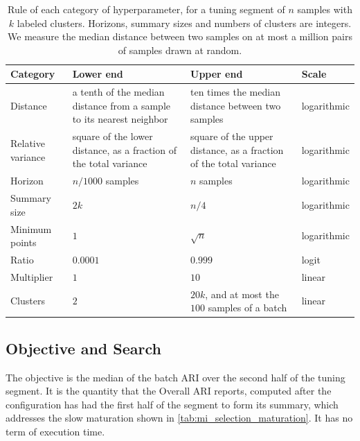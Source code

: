 \begin{table}[htbp]
\centering
\caption[Rule of each category of hyperparameter]{Rule of each category of hyperparameter, for a tuning segment of $n$ samples with $k$ labeled clusters. Horizons, summary sizes and numbers of clusters are integers. We measure the median distance between two samples on at most a million pairs of samples drawn at random.}
\begin{tabular}{p{} p{} p{} l}
\toprule
Category & Lower end & Upper end & Scale \\
\midrule
Distance & a tenth of the median distance from a sample to its nearest neighbor & ten times the median distance between two samples & logarithmic \\
Relative variance & square of the lower distance, as a fraction of the total variance & square of the upper distance, as a fraction of the total variance & logarithmic \\
Horizon & $n/1000$ samples & $n$ samples & logarithmic \\
Summary size & $2k$ & $n/4$ & logarithmic \\
Minimum points & $1$ & $\sqrt{n}$ & logarithmic \\
Ratio & $0.0001$ & $0.999$ & logit \\
Multiplier & $1$ & $10$ & linear \\
Clusters & $2$ & $20k$, and at most the $100$ samples of a batch & linear \\
\bottomrule
\end{tabular}
\label{tab:mod_rules}
\end{table}



\subsection{Objective and Search}
\label{subsec:mod_objective}

The objective is the median of the batch ARI over the second half of the tuning segment. It is the quantity that the Overall ARI reports, computed after the configuration has had the first half of the segment to form its summary, which addresses the slow maturation shown in \cref{tab:mi_selection_maturation}. It has no term of execution time.

